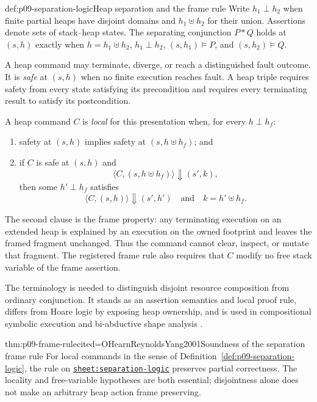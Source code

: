 \begin{hbdefinition}{def:p09-separation-logic}{Heap separation and the frame rule}
Write \(h_1\perp h_2\) when finite partial heaps have disjoint domains and
\(h_1\uplus h_2\) for their union.  Assertions denote sets of stack--heap
states.  The separating conjunction \(P*Q\) holds at \((s,h)\) exactly when
\(h=h_1\uplus h_2\), \(h_1\perp h_2\), \((s,h_1)\models P\), and
\((s,h_2)\models Q\).

A heap command may terminate, diverge, or reach a distinguished fault outcome.
It is \emph{safe} at \((s,h)\) when no finite execution reaches fault.  A heap
triple requires safety from every state satisfying its precondition and
requires every terminating result to satisfy its postcondition.

A heap command \(C\) is \emph{local} for this presentation when, for every
\(h\perp h_f\):
\begin{enumerate}
\item safety at \((s,h)\) implies safety at \((s,h\uplus h_f)\); and
\item if \(C\) is safe at \((s,h)\) and
\[
 \langle C,(s,h\uplus h_f)\rangle\Downarrow(s',k),
\]
then some \(h'\perp h_f\) satisfies
\[
 \langle C,(s,h)\rangle\Downarrow(s',h')
 \quad\text{and}\quad k=h'\uplus h_f.
\]
\end{enumerate}
The second clause is the frame property: any terminating execution on an
extended heap is explained by an execution on the owned footprint and leaves
the framed fragment unchanged.  Thus the command cannot clear, inspect, or
mutate that fragment.  The
registered frame rule also requires that \(C\) modify no free stack variable
of the frame assertion.

The terminology is needed to distinguish disjoint resource composition from
ordinary conjunction. It stands as an assertion semantics and local proof
rule, differs from Hoare logic by exposing heap ownership, and is used in
compositional symbolic execution and bi-abductive shape analysis
\cite{OHearnReynoldsYang2001,ReynoldsSeparation2002,
CalcagnoDistefanoOHearnYang2009}.
\end{hbdefinition}

\begin{hbtheorem}{thm:p09-frame-rule}{cited=OHearnReynoldsYang2001}{Soundness of the separation frame rule}
For local commands in the sense of
Definition~\ref{def:p09-separation-logic}, the rule on
\hyperref[sheet:separation-logic]{\texttt{sheet:separation-logic}} preserves
partial correctness.  The locality and free-variable hypotheses are both
essential; disjointness alone does not make an arbitrary heap action frame
preserving.
\end{hbtheorem}


